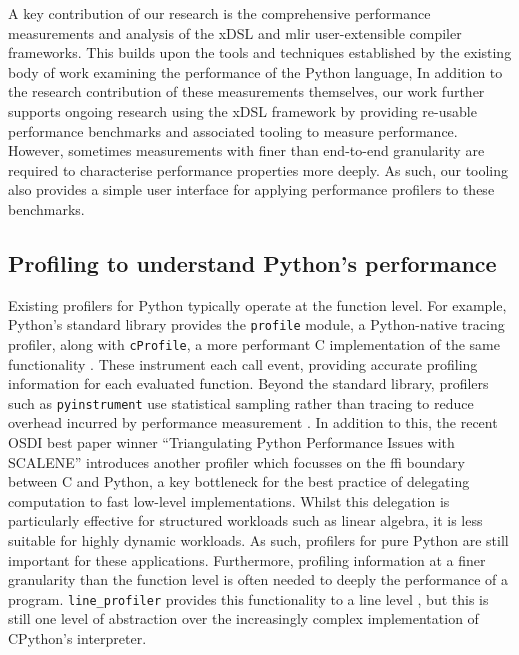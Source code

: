 A key contribution of our research is the comprehensive performance measurements and analysis of the xDSL and \ac{mlir} user-extensible compiler frameworks.
This builds upon the tools and techniques established by the existing body of work examining the performance of the Python language,
In addition to the research contribution of these measurements themselves, our work further supports ongoing research using the xDSL framework by providing re-usable performance benchmarks and associated tooling to measure performance.
However, sometimes measurements with finer than end-to-end granularity are required to characterise performance properties more deeply. As such, our tooling also provides a simple user interface for applying performance profilers to these benchmarks.


\subsection{Profiling to understand Python's performance}
\label{sec:python-performance-profiling}

Existing profilers for Python typically operate at the function level.
For example, Python's standard library provides the \texttt{profile} module, a Python-native tracing profiler, along with \texttt{cProfile}, a more performant C implementation of the same functionality \cite{pythonsoftwarefoundationPythonProfilers}. These instrument each call event, providing accurate profiling information for each evaluated function.
Beyond the standard library, profilers such as \texttt{pyinstrument} use statistical sampling rather than tracing to reduce overhead incurred by performance measurement \cite{rickerbyPyinstrument2025}.
In addition to this, the recent OSDI best paper winner ``Triangulating Python Performance Issues with SCALENE'' \cite{bergerTriangulatingPythonPerformance2023a} introduces another profiler which focusses on the \ac{ffi} boundary between C and Python, a key bottleneck for the best practice of delegating computation to fast low-level implementations.
Whilst this delegation is particularly effective for structured workloads such as linear algebra, it is less suitable for highly dynamic workloads. %
As such, profilers for pure Python are still important for these applications.
Furthermore, profiling information at a finer granularity than the function level is often needed to deeply the performance of a program.
\texttt{line\_profiler} provides this functionality to a line level \cite{robertkernPyutilsLine_profiler2025}, but this is still one level of abstraction over the increasingly complex implementation of CPython's interpreter.

